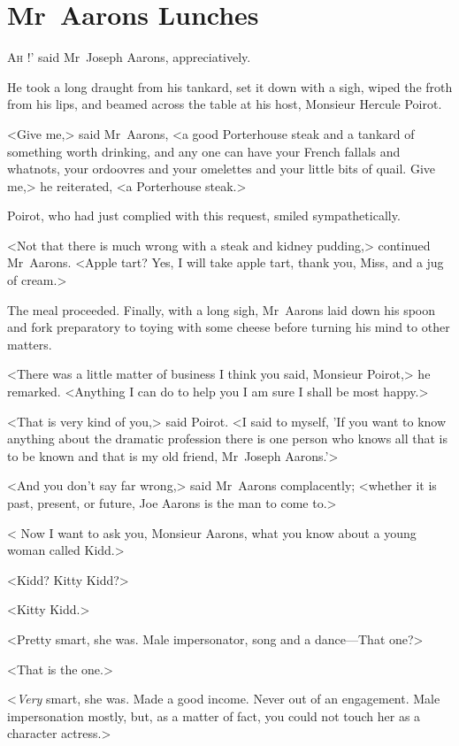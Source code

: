 \chapter{Mr~Aarons Lunches}



\lettrine[ante=`]{A}{h} !' said Mr~Joseph Aarons, appreciatively.

\zz
He took a long draught from his tankard, set it down with a sigh, wiped the froth from his lips, and beamed across the table at his host, Monsieur Hercule Poirot.

<Give me,> said Mr~Aarons, <a good Porterhouse steak and a tankard of something worth drinking, and any one can have your French fallals and whatnots, your ordoovres and your omelettes and your little bits of quail. Give me,> he reiterated, <a Porterhouse steak.>

Poirot, who had just complied with this request, smiled sympathetically.

<Not that there is much wrong with a steak and kidney pudding,> continued Mr~Aarons. <Apple tart? Yes, I will take apple tart, thank you, Miss, and a jug of cream.>

The meal proceeded. Finally, with a long sigh, Mr~Aarons laid down his spoon and fork preparatory to toying with some cheese before turning his mind to other matters.

<There was a little matter of business I think you said, Monsieur Poirot,> he remarked. <Anything I can do to help you I am sure I shall be most happy.>

<That is very kind of you,> said Poirot. <I said to myself, 'If you want to know anything about the dramatic profession there is one person who knows all that is to be known and that is my old friend, Mr~Joseph Aarons.'>

<And you don't say far wrong,> said Mr~Aarons complacently; <whether it is past, present, or future, Joe Aarons is the man to come to.>

< Now I want to ask you, Monsieur Aarons, what you know about a young woman called Kidd.>

<Kidd? Kitty Kidd?>

<Kitty Kidd.>

<Pretty smart, she was. Male impersonator, song and a dance—That one?>

<That is the one.>

<\emph{Very} smart, she was. Made a good income. Never out of an engagement. Male impersonation mostly, but, as a matter of fact, you could not touch her as a character actress.>

